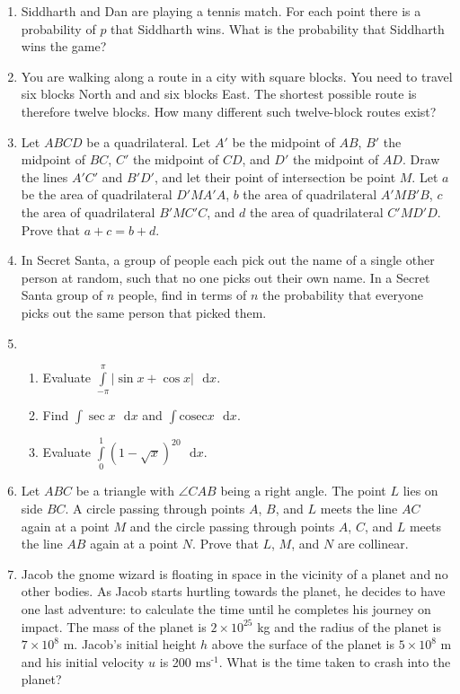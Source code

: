 \documentclass{article}
\begin{document}
\begin{enumerate}
    \item
    Siddharth and Dan are playing a tennis match. For each point there is a probability of $p$ that Siddharth wins. What is the probability that Siddharth wins the game?
    
    \item
    You are walking along a route in a city with square blocks. You need to travel six blocks North and and six blocks East. The shortest possible route is therefore twelve blocks. How many different such twelve-block routes exist?
    
    \item
    Let $ABCD$ be a quadrilateral. Let $A'$ be the midpoint of $AB$, $B'$ the midpoint of $BC$, $C'$ the midpoint of $CD$, and $D'$ the midpoint of $AD$. Draw the lines $A'C'$ and $B'D'$, and let their point of intersection be point $M$. Let $a$ be the area of quadrilateral $D'MA'A$, $b$ the area of quadrilateral $A'MB'B$, $c$ the area of quadrilateral $B'MC'C$, and $d$ the area of quadrilateral $C'MD'D$. Prove that $a + c =  b + d$.
    
    \item
    In Secret Santa, a group of people each pick out the name of a single other person at random, such that no one picks out their own name. In a Secret Santa group of $n$ people, find in terms of $n$ the probability that everyone picks out the same person that picked them.
    
    \item
    \begin{enumerate}
        \item Evaluate $\int \limits_{-\pi}^{\pi} |\sin x + \cos x|\text{ }\mathrm{d}x$.
        \item Find $\int \sec x \text{ }\mathrm{d}x$ and $\int \mathrm{cosec} x \text{ }\mathrm{d}x$.
        \item Evaluate $\int \limits_{0}^{1} (1-\sqrt{x})^{20} \text{ }\mathrm{d}x$.
    \end{enumerate}
    
    \item
    Let $ABC$ be a triangle with $\angle CAB$ being a right angle. The point $L$ lies on side $BC$. A circle passing through points $A$, $B$, and $L$ meets the line $AC$ again at a point $M$ and the circle passing through points $A$, $C$, and $L$ meets the line $AB$ again at a point $N$. Prove that $L$, $M$, and $N$ are collinear.
    
    
            
    \item
    Jacob the gnome wizard is floating in space in the vicinity of a planet and no other bodies. As Jacob starts hurtling towards the planet, he decides to have one last adventure: to calculate the time until he completes his journey on impact. The mass of the planet is $2 \times 10^{25}$ kg and the radius of the planet is $7 \times 10^8$ m. Jacob's initial height $h$ above the surface of the planet is $5 \times 10^8$ m and his initial velocity $u$ is 200 $\text{ms}^{\text{-1}}$. What is the time taken to crash into the planet?
    

\end{enumerate}
\end{document}
